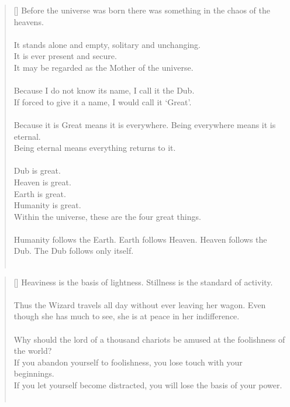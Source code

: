 \documentclass{article}
\begin{document}
\settowidth{\versewidth}{The Wizard leads byemptying people’s minds, filling their bellies, weakening their am- bitions, and making them become strong}
\begin{verse}[\versewidth]
Before the universe was born there was something in the chaos of the heavens.\\
\hfill\\
It stands alone and empty, solitary and unchanging.\\
It is ever present and secure.\\
It may be regarded as the Mother of the universe.\\
\hfill\\
Because I do not know its name, I call it the Dub.\\
If forced to give it a name, I would call it `Great'.\\
\hfill\\
Because it is Great means it is everywhere. 
Being everywhere means it is eternal.\\
Being eternal means everything returns to it.\\
\hfill\\
Dub is great.\\
Heaven is great.\\
Earth is great.\\
Humanity is great.\\
Within the universe, these are the four great things.\\
\hfill\\
Humanity follows the Earth. 
Earth follows Heaven. 
Heaven follows the Dub. 
The Dub follows only itself.\\
\hfill\\
\end{verse}

\settowidth{\versewidth}{The Wizard leads byemptying people’s minds, filling their bellies, weakening their am- bitions, and making them become strong}
\begin{verse}[\versewidth]
Heaviness is the basis of lightness. 
Stillness is the standard of activity.\\
\hfill\\
Thus the Wizard travels all day without ever leaving her wagon. 
Even though she has much to see, she is at peace in her indifference.\\
\hfill\\
Why should the lord of a thousand chariots be amused at the foolishness of the world?\\
If you abandon yourself to foolishness, you lose touch with your beginnings.\\
If you let yourself become distracted, you will lose the basis of your power.\\
\hfill\\
\end{verse}
\end{document}
